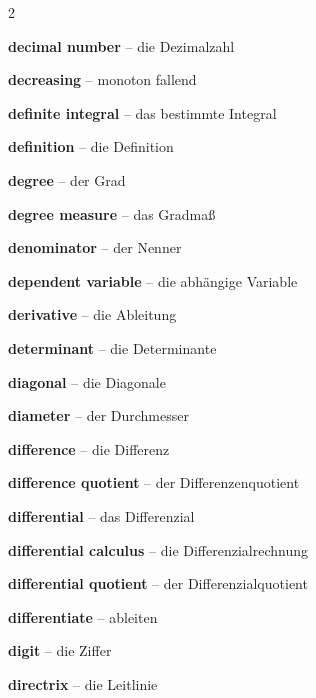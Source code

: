 \begin{multicols}{2}
\par\nopagebreak
\textbf{decimal number} -- die Dezimalzahl\dotfill\hyperref[e:13]{\pageref*{e:13}}\par
\textbf{decreasing} -- monoton fallend\dotfill\hyperref[e:143]{\pageref*{e:143}}\par
\textbf{definite integral} -- das bestimmte Integral\dotfill\hyperref[e:288]{\pageref*{e:288}}\par
\textbf{definition} -- die Definition\dotfill\hyperref[e:346]{\pageref*{e:346}}\par
\textbf{degree} -- der Grad\dotfill\hyperref[e:75]{\pageref*{e:75}}\par
\textbf{degree measure} -- das Gradmaß\dotfill\hyperref[e:138]{\pageref*{e:138}}\par
\textbf{denominator} -- der Nenner\dotfill\hyperref[e:30]{\pageref*{e:30}}\par
\textbf{dependent variable} -- die abhängige Variable\dotfill\hyperref[e:107]{\pageref*{e:107}}\par
\textbf{derivative} -- die Ableitung\dotfill\hyperref[e:273]{\pageref*{e:273}}\par
\textbf{determinant} -- die Determinante\dotfill\hyperref[e:325]{\pageref*{e:325}}\par
\textbf{diagonal} -- die Diagonale\dotfill\hyperref[e:197]{\pageref*{e:197}}\par
\textbf{diameter} -- der Durchmesser\dotfill\hyperref[e:214]{\pageref*{e:214}}\par
\textbf{difference} -- die Differenz\dotfill\hyperref[e:18]{\pageref*{e:18}}\par
\textbf{difference quotient} -- der Differenzenquotient\dotfill\hyperref[e:272]{\pageref*{e:272}}\par
\textbf{differential} -- das Differenzial\dotfill\hyperref[e:276]{\pageref*{e:276}}\par
\textbf{differential calculus} -- die Differenzialrechnung\dotfill\hyperref[e:274]{\pageref*{e:274}}\par
\textbf{differential quotient} -- der Differenzialquotient\dotfill\hyperref[e:275]{\pageref*{e:275}}\par
\textbf{differentiate} -- ableiten\dotfill\hyperref[e:278]{\pageref*{e:278}}\par
\textbf{digit} -- die Ziffer\dotfill\hyperref[e:2]{\pageref*{e:2}}\par
\textbf{directrix} -- die Leitlinie\dotfill\hyperref[e:318]{\pageref*{e:318}}\par

\end{multicols}
